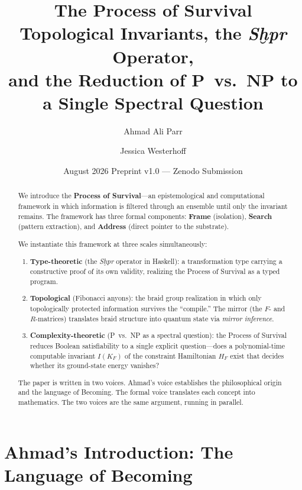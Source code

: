 \documentclass[11pt,letterpaper]{article}
\title{\textbf{The Process of Survival}\\[4pt]
\large Topological Invariants, the \textit{Sḫpr} Operator,\\
and the Reduction of P~vs.~NP to a Single Spectral Question}
\author[1]{Ahmad Ali Parr}
\author[1]{Jessica Westerhoff}
\affil[1]{SnapKitty Collective $\cdot$ SNAPKITTYWEST $\cdot$
  Bel Esprit D'Accord Irrevocable Trust}
\date{August 2026 \quad Preprint v1.0 — Zenodo Submission}
\begin{document}
\maketitle
\thispagestyle{empty}

\begin{abstract}
We introduce the \textbf{Process of Survival}---an epistemological and
computational framework in which information is filtered through an ensemble
until only the invariant remains.  The framework has three formal components:
\textbf{Frame} (isolation), \textbf{Search} (pattern extraction), and
\textbf{Address} (direct pointer to the substrate).

We instantiate this framework at three scales simultaneously:

\begin{enumerate}[nosep]
\item \textbf{Type-theoretic} (the \textit{Sḫpr} operator in Haskell): a
  transformation type carrying a constructive proof of its own validity,
  realizing the Process of Survival as a typed program.
\item \textbf{Topological} (Fibonacci anyons): the braid group realization in
  which only topologically protected information survives the ``compile.''
  The mirror (the $F$- and $R$-matrices) translates braid structure into
  quantum state via \textit{mirror inference}.
\item \textbf{Complexity-theoretic} (P~vs.~NP as a spectral question): the
  Process of Survival reduces Boolean satisfiability to a single explicit
  question---does a polynomial-time computable invariant $I(K_F)$ of the
  constraint Hamiltonian $H_F$ exist that decides whether its ground-state
  energy vanishes?
\end{enumerate}

The paper is written in two voices.  Ahmad's voice establishes the
philosophical origin and the language of Becoming.  The formal voice
translates each concept into mathematics.  The two voices are the same
argument, running in parallel.
\end{abstract}

\tableofcontents
\newpage

\section{Ahmad's Introduction: The Language of Becoming}
\label{sec:ahmad}
\end{document}
